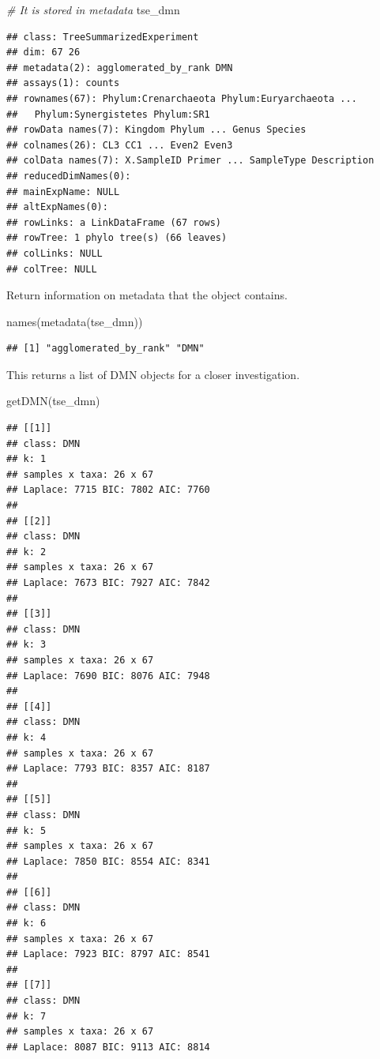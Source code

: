 \documentclass[
]{book}
\newenvironment{Shaded}{\begin{snugshade}}{\end{snugshade}}
\newcommand{\CommentTok}[1]{\textcolor[rgb]{0.56,0.35,0.01}{\textit{#1}}}
\newcommand{\FunctionTok}[1]{\textcolor[rgb]{0.00,0.00,0.00}{#1}}
\newcommand{\NormalTok}[1]{#1}
\begin{document}
\begin{Shaded}
\begin{Highlighting}[]
\CommentTok{\# It is stored in metadata}
\NormalTok{tse\_dmn}
\end{Highlighting}
\end{Shaded}

\begin{verbatim}
## class: TreeSummarizedExperiment 
## dim: 67 26 
## metadata(2): agglomerated_by_rank DMN
## assays(1): counts
## rownames(67): Phylum:Crenarchaeota Phylum:Euryarchaeota ...
##   Phylum:Synergistetes Phylum:SR1
## rowData names(7): Kingdom Phylum ... Genus Species
## colnames(26): CL3 CC1 ... Even2 Even3
## colData names(7): X.SampleID Primer ... SampleType Description
## reducedDimNames(0):
## mainExpName: NULL
## altExpNames(0):
## rowLinks: a LinkDataFrame (67 rows)
## rowTree: 1 phylo tree(s) (66 leaves)
## colLinks: NULL
## colTree: NULL
\end{verbatim}

Return information on metadata that the object contains.

\begin{Shaded}
\begin{Highlighting}[]
\FunctionTok{names}\NormalTok{(}\FunctionTok{metadata}\NormalTok{(tse\_dmn))}
\end{Highlighting}
\end{Shaded}

\begin{verbatim}
## [1] "agglomerated_by_rank" "DMN"
\end{verbatim}

This returns a list of DMN objects for a closer investigation.

\begin{Shaded}
\begin{Highlighting}[]
\FunctionTok{getDMN}\NormalTok{(tse\_dmn)}
\end{Highlighting}
\end{Shaded}

\begin{verbatim}
## [[1]]
## class: DMN 
## k: 1 
## samples x taxa: 26 x 67 
## Laplace: 7715 BIC: 7802 AIC: 7760 
## 
## [[2]]
## class: DMN 
## k: 2 
## samples x taxa: 26 x 67 
## Laplace: 7673 BIC: 7927 AIC: 7842 
## 
## [[3]]
## class: DMN 
## k: 3 
## samples x taxa: 26 x 67 
## Laplace: 7690 BIC: 8076 AIC: 7948 
## 
## [[4]]
## class: DMN 
## k: 4 
## samples x taxa: 26 x 67 
## Laplace: 7793 BIC: 8357 AIC: 8187 
## 
## [[5]]
## class: DMN 
## k: 5 
## samples x taxa: 26 x 67 
## Laplace: 7850 BIC: 8554 AIC: 8341 
## 
## [[6]]
## class: DMN 
## k: 6 
## samples x taxa: 26 x 67 
## Laplace: 7923 BIC: 8797 AIC: 8541 
## 
## [[7]]
## class: DMN 
## k: 7 
## samples x taxa: 26 x 67 
## Laplace: 8087 BIC: 9113 AIC: 8814
\end{verbatim}
\end{document}

